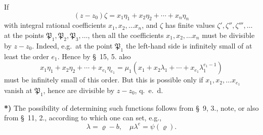 \documentclass{article}
\begin{document}
If
\[ (z-z_{0})\zeta = x_{1}\eta_{1} + x_{2}\eta_{2} + \cdots + x_{n}\eta_{n} \]
with integral rational coefficients $x_{1}, x_{2}, \ldots x_{n}$, and $\zeta$ has finite values $\zeta', \zeta'', \zeta''', \ldots$ at the points $\mathfrak{P}_{1}, \mathfrak{P}_{2}, \mathfrak{P}_{3}, \ldots$, then all the coefficients $x_{1}, x_{2}, \ldots x_{n}$ must be divisible by $z-z_{0}$. Indeed, e.g.\ at the point $\mathfrak{P}_{1}$ the left-hand side is infinitely small of at least the order $e_{1}$. Hence by §~15, 5. also
\[ x_{1}\eta_{1} + x_{2}\eta_{2} + \cdots + x_{e_{1}}\eta_{e_{1}} = \mu_{1}(x_{1} + x_{2}\lambda_{1} + \cdots + x_{e_{1}}\lambda_{1}^{e_{1}-1}) \]
must be infinitely small of this order. But this is possible only if $x_{1}, x_{2}, \ldots x_{e_{1}}$ vanish at $\mathfrak{P}_{1}$, hence are divisible by $z-z_{0}$, q.\ e.\ d.

\textbf{*)} The possibility of determining such functions follows from §~9, 3., note, or also from §~11, 2., according to which one can set, e.g.,
\[ \lambda = \varrho - b, \quad \mu\lambda^{e} = \psi(\varrho). \]

\end{document}
